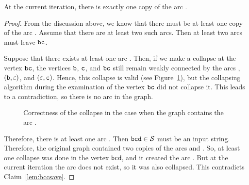 \begin{lemma}
\label{lem:bbcone}
At the current iteration, there is exactly one copy of the arc .
\end{lemma}
\begin{proof}
From the discussion above, we know that there must be at least one copy of the arc . Assume that there are at least two such arcs. Then at least two arcs must leave $ {\tt bc} $.

Suppose that there exists at least one arc . Then, if we make a collapse at the vertex $ {\tt bc} $, the vertices $ {\tt b} $, $ {\tt c} $, and $ {\tt bc} $ still remain weakly connected by the arcs , $ ({\tt b}, \varepsilon) $, and $ (\varepsilon, {\tt c}) $. Hence, this collapse is valid (see Figure~\ref{fig:lvl1lemmabcc}), but the collapsing algorithm during the examination of the vertex $ {\tt bc} $ did not collapse it. This leads to a contradiction, so there is no arc  in the graph.

\begin{figure}[ht]
\begin{center}

\end{center}

\caption{Correctness of the collapse in the case when the graph contains the arc .}\label{fig:lvl1lemmabcc}
\end{figure}

Therefore, there is at least one arc . Then $ {\tt bcd} \in {\cal S} $ must be an input string. Therefore, the original graph contained two copies of the arcs  and . So, at least one collapse was done in the vertex {\tt bcd}, and it created the arc . But at the current iteration the arc  does not exist, so it was also collapsed. This contradicts Claim~\ref{lem:bccsave}.
\end{proof}

